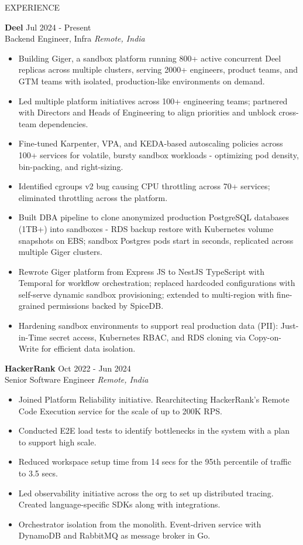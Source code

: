 \documentclass{resume} %
\begin{document}
\begin{rSection}{EXPERIENCE}

\textbf{Deel} \hfill Jul 2024 - Present \\
Backend Engineer, Infra \hfill \textit{Remote, India}
 \begin{itemize}
    \itemsep -3pt {}
     \item Building Giger, a sandbox platform running 800+ active concurrent Deel replicas across multiple clusters, serving 2000+ engineers, product teams, and GTM teams with isolated, production-like environments on demand.
     \item Led multiple platform initiatives across 100+ engineering teams; partnered with Directors and Heads of Engineering to align priorities and unblock cross-team dependencies.
     \item Fine-tuned Karpenter, VPA, and KEDA-based autoscaling policies across 100+ services for volatile, bursty sandbox workloads - optimizing pod density, bin-packing, and right-sizing.
     \item Identified cgroups v2 bug causing CPU throttling across 70+ services; eliminated throttling across the platform.
     \item Built DBA pipeline to clone anonymized production PostgreSQL databases (1TB+) into sandboxes - RDS backup restore with Kubernetes volume snapshots on EBS; sandbox Postgres pods start in seconds, replicated across multiple Giger clusters.
     \item Rewrote Giger platform from Express JS to NestJS TypeScript with Temporal for workflow orchestration; replaced hardcoded configurations with self-serve dynamic sandbox provisioning; extended to multi-region with fine-grained permissions backed by SpiceDB.
     \item Hardening sandbox environments to support real production data (PII): Just-in-Time secret access, Kubernetes RBAC, and RDS cloning via Copy-on-Write for efficient data isolation.
 \end{itemize}

\textbf{HackerRank} \hfill Oct 2022 - Jun 2024 \\
 Senior Software Engineer \hfill \textit{Remote, India}
 \begin{itemize}
    \itemsep -3pt {}
     \item Joined Platform Reliability initiative. Rearchitecting HackerRank's Remote Code Execution service for the scale of up to 200K RPS.
     \item Conducted E2E load tests to identify bottlenecks in the system with a plan to support high scale.
     \item Reduced workspace setup time from 14 secs for the 95th percentile of traffic to 3.5 secs.
     \item Led observability initiative across the org to set up distributed tracing. Created language-specific SDKs along with integrations.
     \item Orchestrator isolation from the monolith. Event-driven service with DynamoDB and RabbitMQ as message broker in Go.
 \end{itemize}


\end{rSection}
\end{document}
